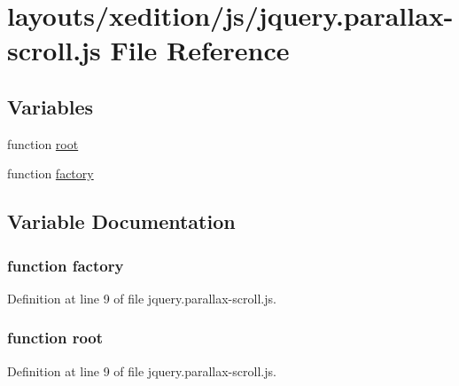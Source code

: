 \hypertarget{jquery_8parallax-scroll_8js}{}\section{layouts/xedition/js/jquery.parallax-\/scroll.js File Reference}
\label{jquery_8parallax-scroll_8js}
\subsection*{Variables}
\begin{DoxyCompactItemize}
\item 
function \hyperlink{jquery_8parallax-scroll_8js_a11a10a6834f3c54a5380f4ff04d002a9}{root}
\item 
function \hyperlink{jquery_8parallax-scroll_8js_abf075bdbe59fd2c3336ed052c9c72b31}{factory}
\end{DoxyCompactItemize}


\subsection{Variable Documentation}
\subsubsection[{\texorpdfstring{factory}{factory}}]{\setlength{\rightskip}{0pt plus 5cm}function factory}\hypertarget{jquery_8parallax-scroll_8js_abf075bdbe59fd2c3336ed052c9c72b31}{}\label{jquery_8parallax-scroll_8js_abf075bdbe59fd2c3336ed052c9c72b31}


Definition at line 9 of file jquery.\+parallax-\/scroll.\+js.

\subsubsection[{\texorpdfstring{root}{root}}]{\setlength{\rightskip}{0pt plus 5cm}function root}\hypertarget{jquery_8parallax-scroll_8js_a11a10a6834f3c54a5380f4ff04d002a9}{}\label{jquery_8parallax-scroll_8js_a11a10a6834f3c54a5380f4ff04d002a9}


Definition at line 9 of file jquery.\+parallax-\/scroll.\+js.

